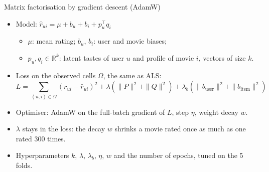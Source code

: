 
\begin{frame}{Matrix factorisation by gradient descent (AdamW)}
  \small
  \begin{itemize}
    \item Model: $\hat r_{ui} = \mu + b_u + b_i + p_u^\top q_i$
      \begin{itemize}
        \item $\mu$: mean rating; $b_u$, $b_i$: user and movie biases;
        \item $p_u, q_i \in \mathbb{R}^k$: latent tastes of user $u$ and profile of movie $i$, vectors of size $k$.
      \end{itemize}
    \item Loss on the observed cells $\Omega$, the same as ALS:
      \[
        L = \sum_{(u,i) \in \Omega} (r_{ui} - \hat r_{ui})^2 + \lambda \left( \|P\|^2 + \|Q\|^2 \right) + \lambda_b \left( \|b_{\text{user}}\|^2 + \|b_{\text{item}}\|^2 \right)
      \]
    \item Optimiser: AdamW on the full-batch gradient of $L$, step $\eta$, weight decay $w$.
    \item $\lambda$ stays in the loss: the decay $w$ shrinks a movie rated once as much as one rated 300 times.
    \item Hyperparameters $k$, $\lambda$, $\lambda_b$, $\eta$, $w$ and the number of epochs, tuned on the 5 folds.
  \end{itemize}
\end{frame}
